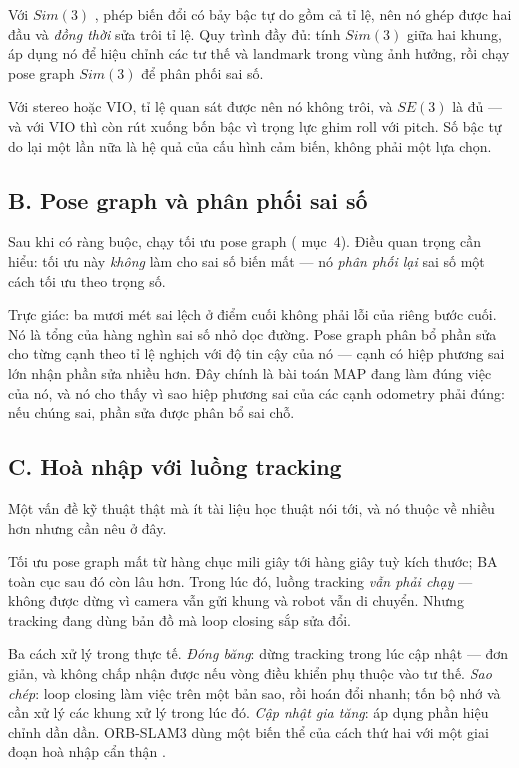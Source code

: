 \documentclass[../../vslam.tex]{subfiles}
\begin{document}
Với \(Sim(3)\) \cite{strasdat2010scaledrift}, phép biến đổi có bảy bậc tự do gồm cả tỉ lệ, nên nó ghép được hai đầu và \emph{đồng thời} sửa trôi tỉ lệ. Quy trình đầy đủ: tính \(Sim(3)\) giữa hai khung, áp dụng nó để hiệu chỉnh các tư thế và landmark trong vùng ảnh hưởng, rồi chạy pose graph \(Sim(3)\) để phân phối sai số.

Với stereo hoặc VIO, tỉ lệ quan sát được nên nó không trôi, và \(SE(3)\) là đủ --- và với VIO thì còn rút xuống bốn bậc vì trọng lực ghim roll với pitch. Số bậc tự do lại một lần nữa là hệ quả của cấu hình cảm biến, không phải một lựa chọn.

\subsection{B. Pose graph và phân phối sai số}

Sau khi có ràng buộc, chạy tối ưu pose graph ( mục~4). Điều quan trọng cần hiểu: tối ưu này \emph{không} làm cho sai số biến mất --- nó \emph{phân phối lại} sai số một cách tối ưu theo trọng số.

Trực giác: ba mươi mét sai lệch ở điểm cuối không phải lỗi của riêng bước cuối. Nó là tổng của hàng nghìn sai số nhỏ dọc đường. Pose graph phân bổ phần sửa cho từng cạnh theo tỉ lệ nghịch với độ tin cậy của nó --- cạnh có hiệp phương sai lớn nhận phần sửa nhiều hơn. Đây chính là bài toán MAP đang làm đúng việc của nó, và nó cho thấy vì sao hiệp phương sai của các cạnh odometry phải đúng: nếu chúng sai, phần sửa được phân bổ sai chỗ.

\subsection{C. Hoà nhập với luồng tracking}

Một vấn đề kỹ thuật thật mà ít tài liệu học thuật nói tới, và nó thuộc về  nhiều hơn nhưng cần nêu ở đây.

Tối ưu pose graph mất từ hàng chục mili giây tới hàng giây tuỳ kích thước; BA toàn cục sau đó còn lâu hơn. Trong lúc đó, luồng tracking \emph{vẫn phải chạy} --- không được dừng vì camera vẫn gửi khung và robot vẫn di chuyển. Nhưng tracking đang dùng bản đồ mà loop closing sắp sửa đổi.

Ba cách xử lý trong thực tế. \emph{Đóng băng}: dừng tracking trong lúc cập nhật --- đơn giản, và không chấp nhận được nếu vòng điều khiển phụ thuộc vào tư thế. \emph{Sao chép}: loop closing làm việc trên một bản sao, rồi hoán đổi nhanh; tốn bộ nhớ và cần xử lý các khung xử lý trong lúc đó. \emph{Cập nhật gia tăng}: áp dụng phần hiệu chỉnh dần dần. ORB-SLAM3 dùng một biến thể của cách thứ hai với một giai đoạn hoà nhập cẩn thận \cite{campos2021orbslam3}.
\end{document}
